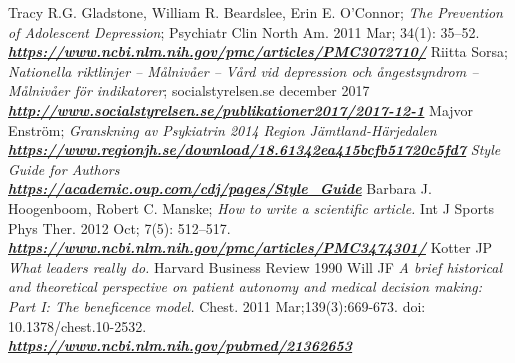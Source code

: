 \documentclass[12pt,a4paper,oneside]{article}
\begin{document}
\begin{thebibliography}{11}
Tracy R.G. Gladstone, William R. Beardslee, Erin E. O'Connor; \emph{The Prevention of Adolescent Depression}; Psychiatr Clin North Am. 2011 Mar; 34(1): 35--52. \\\textbf{\emph{\href{https://www.ncbi.nlm.nih.gov/pmc/articles/PMC3072710/}{\url{https://www.ncbi.nlm.nih.gov/pmc/articles/PMC3072710/}}}}
Riitta Sorsa; \emph{Nationella riktlinjer -- M\r{a}lniv\r{a}er -- V\r{a}rd vid depression och \r{a}ngestsyndrom -- M\r{a}lniv\r{a}er f{\"o}r indikatorer}; socialstyrelsen.se december 2017\\\textbf{\emph{\href{http://www.socialstyrelsen.se/publikationer2017/2017-12-1}{\url{http://www.socialstyrelsen.se/publikationer2017/2017-12-1}}}}
Majvor Enstr{\"o}m; \emph{Granskning av Psykiatrin 2014 Region J{\"a}mtland-H{\"a}rjedalen}\\\textbf{\emph{\href{https://www.regionjh.se/download/18.61342ea415bcfb51720c5fd7}{\url{https://www.regionjh.se/download/18.61342ea415bcfb51720c5fd7}}}}
\emph{Style Guide for Authors} \\\textbf{\emph{\href{https://academic.oup.com/cdj/pages/Style_Guide}{\url{https://academic.oup.com/cdj/pages/Style_Guide}}}}
Barbara J. Hoogenboom, Robert C. Manske; \emph{How to write a scientific article.} Int J Sports Phys Ther. 2012 Oct; 7(5): 512--517. \\\textbf{\emph{\href{https://www.ncbi.nlm.nih.gov/pmc/articles/PMC3474301/}{\url{https://www.ncbi.nlm.nih.gov/pmc/articles/PMC3474301/}}}}
Kotter JP \emph{What leaders really do.} Harvard Business Review 1990
Will JF \emph{A brief historical and theoretical perspective on patient autonomy and medical decision making: Part I: The beneficence model.} Chest. 2011 Mar;139(3):669-673. doi: 10.1378/chest.10-2532. \\\textbf{\emph{\href{https://www.ncbi.nlm.nih.gov/pubmed/21362653}{\url{https://www.ncbi.nlm.nih.gov/pubmed/21362653}}}}


\end{thebibliography}
\end{document}

